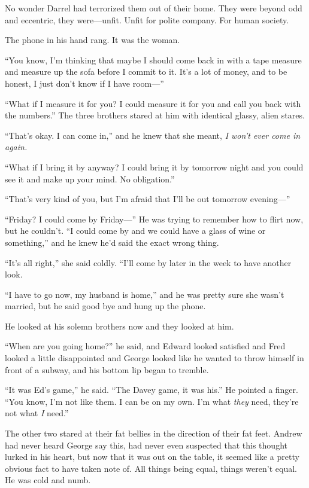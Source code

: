 \documentclass{article}
\begin{document}
No wonder Darrel had terrorized them out of their home.  They were
beyond odd and eccentric, they were---unfit.  Unfit for polite
company.  For human society.

The phone in his hand rang.  It was the woman.

``You know, I'm thinking that maybe I should come back in with a tape
measure and measure up the sofa before I commit to it.  It's a lot of
money, and to be honest, I just don't know if I have room---''

``What if I measure it for you?  I could measure it for you and call
you back with the numbers.'' The three brothers stared at him with
identical glassy, alien stares.

``That's okay.  I can come in,'' and he knew that she meant, \textit{I
won't ever come in again.}

``What if I bring it by anyway?  I could bring it by tomorrow night
and you could see it and make up your mind.  No obligation.''

``That's very kind of you, but I'm afraid that I'll be out tomorrow
evening---''

``Friday?  I could come by Friday---'' He was trying to remember how
to flirt now, but he couldn't.  ``I could come by and we could have a
glass of wine or something,'' and he knew he'd said the exact wrong
thing.

``It's all right,'' she said coldly.  ``I'll come by later in the week
to have another look.

``I have to go now, my husband is home,'' and he was pretty sure she
wasn't married, but he said good bye and hung up the phone.

He looked at his solemn brothers now and they looked at him.

``When are you going home?'' he said, and Edward looked satisfied and
Fred looked a little disappointed and George looked like he wanted to
throw himself in front of a subway, and his bottom lip began to
tremble.

``It was Ed's game,'' he said.  ``The Davey game, it was his.'' He
pointed a finger.  ``You know, I'm not like them.  I can be on my own. 
I'm what \textit{they} need, they're not what \textit{I} need.''

The other two stared at their fat bellies in the direction of their
fat feet.  Andrew had never heard George say this, had never even
suspected that this thought lurked in his heart, but now that it was
out on the table, it seemed like a pretty obvious fact to have taken
note of.  All things being equal, things weren't equal.  He was cold
and numb.
\end{document}
